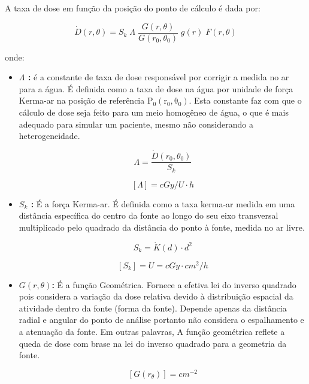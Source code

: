 \documentclass[11pt,a4paper]{article}
\begin{document}
			A taxa de dose em função da posição do ponto de cálculo é dada por:

			\begin{equation}
				\dot{D}(r, \theta) = S_k \; \varLambda \; \frac{G(r, \theta)}{G(r_0, \theta_0)} 
				\; g(r) \; F(r, \theta)
				\label{eq:formalismoTg43}
			\end{equation}

			onde:

			\begin{itemize}
				\item \textbf{\textcolor{CarnationPink}{$\varLambda$} : } é a constante de taxa de dose responsável por corrigir a medida no ar para a água. É definida como a taxa de dose na água por unidade de força Kerma-ar na posição de referência $\mathrm{P_0(r_0, \theta_0)}$. Esta constante faz com que o cálculo de dose seja feito para um meio homogêneo de água, o que é mais adequado para simular um paciente, mesmo não considerando a heterogeneidade.

					\begin{equation}
						\varLambda = \frac{\dot{D}(r_0, \theta_0)}{S_k}
					\end{equation}

					$$[\varLambda] = cGy / U \cdot h$$

				\item \textbf{\textcolor{CarnationPink}{$S_k$} : } É a força Kerma-ar. É definida como a taxa kerma-ar medida em uma distância específica do centro da fonte ao longo do seu eixo transversal multiplicado pelo quadrado da distância do ponto à fonte, medida no ar livre.

					\begin{equation}
						S_k = \dot{K}(d) \cdot d^2
					\end{equation}

					$$[S_k] = U = cGy \cdot cm^2 / h$$

				\item \textbf{\textcolor{CarnationPink}{$G(r, \theta)$}: } É a função Geométrica. Fornece a efetiva lei do inverso quadrado pois considera a variação da dose relativa devido à distribuição espacial da atividade dentro da fonte (forma da fonte). Depende apenas da distância radial e angular do ponto de análise portanto não considera o espalhamento e a atenuação da fonte. Em outras palavras, A função geométrica reflete a queda de dose com brase na lei do inverso quadrado para a geometria da fonte.
				
					$$[G(r_ \theta)] = cm^{-2}$$


\end{itemize}
\end{document}
